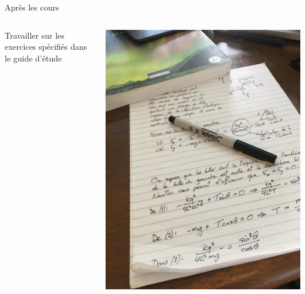 \documentclass[12pt]{beamer}
\begin{document}
\begin{frame}{Après les cours}
\begin{columns}
Travailler sur les exercices spécifiés dans le guide d'étude

\vspace{\baselineskip}


\vspace{\baselineskip}


\includegraphics[width=\textwidth]{images/resoudre.jpg}

\end{columns}

\end{frame}
\end{document}
